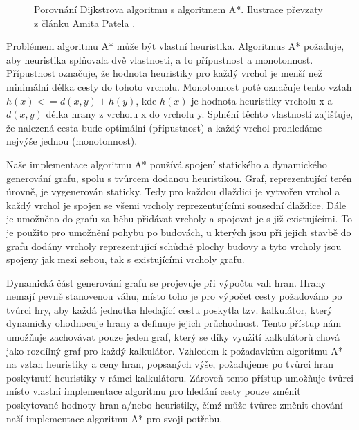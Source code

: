 \begin{figure}[h]
	\centering
	\hfill
	\caption{Porovnání Dijkstrova algoritmu s algoritmem A*. Ilustrace převzaty z článku Amita Patela \citep{site:introastar}.}
	\label{fig:astardijkstra}
\end{figure}

Problémem algoritmu A* může být vlastní heuristika. Algoritmus A* požaduje, aby heuristika splňovala dvě vlastnosti, a to přípustnost a monotonnost. Přípustnost označuje, že hodnota heuristiky pro každý vrchol je menší než minimální délka cesty do tohoto vrcholu. Monotonnost poté označuje tento vztah \(h(x) <= d(x,y) + h(y)\), kde \(h(x)\) je hodnota heuristiky vrcholu x a \(d(x,y)\) délka hrany z vrcholu x do vrcholu y. Splnění těchto vlastností zajišťuje, že nalezená cesta bude optimální (přípustnost) a každý vrchol prohledáme nejvýše jednou (monotonnost). 

Naše implementace algoritmu A* používá spojení statického a dynamického generování grafu, spolu s tvůrcem dodanou heuristikou. Graf, reprezentující terén úrovně, je vygenerován staticky. Tedy pro každou dlaždici je vytvořen vrchol a každý vrchol je spojen se všemi vrcholy reprezentujícími sousední dlaždice. Dále je umožněno do grafu za běhu přidávat vrcholy a spojovat je s již existujícími. To je použito pro umožnění pohybu po budovách, u kterých jsou při jejich stavbě do grafu dodány vrcholy reprezentující schůdné plochy budovy a tyto vrcholy jsou spojeny jak mezi sebou, tak s existujícími vrcholy grafu. 

Dynamická část generování grafu se projevuje při výpočtu vah hran. Hrany nemají pevně stanovenou váhu, místo toho je pro výpočet cesty požadováno po tvůrci hry, aby každá jednotka hledající cestu poskytla tzv. kalkulátor, který dynamicky ohodnocuje hrany a definuje jejich průchodnost. Tento přístup nám umožňuje zachovávat pouze jeden graf, který se díky využití kalkulátorů chová jako rozdílný graf pro každý kalkulátor. 
Vzhledem k požadavkům algoritmu A* na vztah heuristiky a ceny hran, popsaných výše, požadujeme po tvůrci hran poskytnutí heuristiky v rámci kalkulátoru. Zároveň tento přístup umožňuje tvůrci místo vlastní implementace algoritmu pro hledání cesty pouze změnit poskytované hodnoty hran a/nebo heuristiky, čímž může tvůrce změnit chování naší implementace algoritmu A* pro svoji potřebu.


